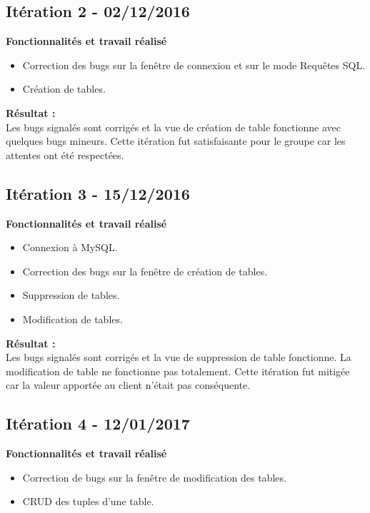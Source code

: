 \subsection{Itération 2 - 02/12/2016}
\textbf{Fonctionnalités et travail réalisé}
\begin{itemize}
\item Correction des bugs sur la fenêtre de connexion et sur le mode Requêtes SQL.
\item Création de tables.\\
\end{itemize}

\textbf{Résultat :}\\
Les bugs signalés sont corrigés et la vue de création de table fonctionne avec quelques bugs mineurs.
Cette itération fut satisfaisante pour le groupe car les attentes ont été respectées.

\subsection{Itération 3 - 15/12/2016}
\textbf{Fonctionnalités et travail réalisé}
\begin{itemize}
\item Connexion à MySQL.
\item Correction des bugs sur la fenêtre de création de tables.
\item Suppression de tables.
\item Modification de tables.\\
\end{itemize}

\textbf{Résultat :}\\
Les bugs signalés sont corrigés et la vue de suppression de table fonctionne.
La modification de table ne fonctionne pas totalement.
Cette itération fut mitigée car la valeur apportée au client n'était pas conséquente. 


\subsection{Itération 4 - 12/01/2017}
\textbf{Fonctionnalités et travail réalisé}
\begin{itemize}
\item Correction de bugs sur la fenêtre de modification des tables.
\item CRUD des tuples d'une table.\\
\end{itemize}

